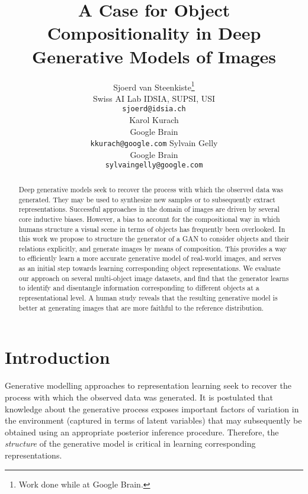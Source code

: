 \documentclass{article}
\title{A Case for Object Compositionality in Deep Generative Models of Images}
\author{%
Sjoerd van Steenkiste\thanks{Work done while at Google Brain.} \\
Swiss AI Lab IDSIA, SUPSI, USI\\
{\footnotesize\texttt{sjoerd@idsia.ch}} \\
\And
Karol Kurach \\
Google Brain \\
{\footnotesize\texttt{kkurach@google.com}} 
\And
Sylvain Gelly \\
Google Brain \\
{\footnotesize\texttt{sylvaingelly@google.com}}
}
\begin{document}
\maketitle


\begin{abstract}
Deep generative models seek to recover the process with which the observed data was generated.
They may be used to synthesize new samples or to subsequently extract representations.
Successful approaches in the domain of images are driven by several core inductive biases.
However, a bias to account for the compositional way in which humans structure a visual scene in terms of objects has frequently been overlooked. 
In this work we propose to structure the generator of a GAN to consider objects and their relations explicitly, and generate images by means of composition.
This provides a way to efficiently learn a more accurate generative model of real-world images, and serves as an initial step towards learning corresponding object representations.
We evaluate our approach on several multi-object image datasets, and find that the generator learns to identify and disentangle information corresponding to different objects at a representational level.
A human study reveals that the resulting generative model is better at generating images that are more faithful to the reference distribution. 
\end{abstract}

\section{Introduction}
Generative modelling approaches to representation learning seek to recover the process with which the observed data was generated.  %
It is postulated that knowledge about the generative process exposes important factors of variation in the environment (captured in terms of latent variables) that may subsequently be obtained using an appropriate posterior inference procedure.
Therefore, the \emph{structure} of the generative model is critical in learning corresponding representations. 
\end{document}

